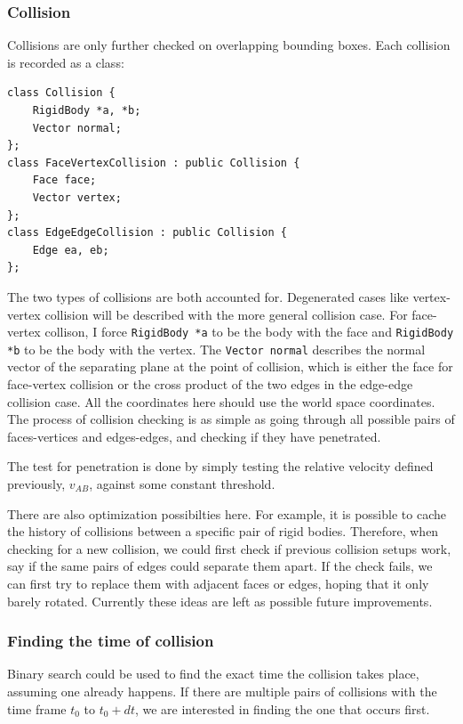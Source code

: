 \documentclass[12pt,a4paper,twoside,openright]{report}
\newcommand{\code}{\texttt}
\begin{document}
\subsubsection{Collision}

Collisions are only further checked on overlapping bounding boxes. Each collision is recorded as a class:

\begin{verbatim}
class Collision {
    RigidBody *a, *b;
    Vector normal;
};
class FaceVertexCollision : public Collision {
    Face face;
    Vector vertex;
};
class EdgeEdgeCollision : public Collision {
    Edge ea, eb;
};
\end{verbatim}

The two types of collisions are both accounted for. Degenerated cases like vertex-vertex collision will be described with the more general collision case. For face-vertex collison, I force \code{RigidBody *a} to be the body with the face and \code{RigidBody *b} to be the body with the vertex. The \code{Vector normal} describes the normal vector of the separating plane at the point of collision, which is either the face for face-vertex collision or the cross product of the two edges in the edge-edge collision case. All the coordinates here should use the world space coordinates. The process of collision checking is as simple as going through all possible pairs of faces-vertices and edges-edges, and checking if they have penetrated. 

The test for penetration is done by simply testing the relative velocity defined previously, $v_{AB}$, against some constant threshold.

There are also optimization possibilties here. For example, it is possible to cache the history of collisions between a specific pair of rigid bodies. Therefore, when checking for a new collision, we could first check if previous collision setups work, say if the same pairs of edges could separate them apart. If the check fails, we can first try to replace them with adjacent faces or edges, hoping that it only barely rotated. Currently these ideas are left as possible future improvements.

\subsubsection{Finding the time of collision}

Binary search could be used to find the exact time the collision takes place, assuming one already happens. If there are multiple pairs of collisions with the time frame $t_0$ to $t_0 + dt$, we are interested in finding the one that occurs first.
\end{document}
